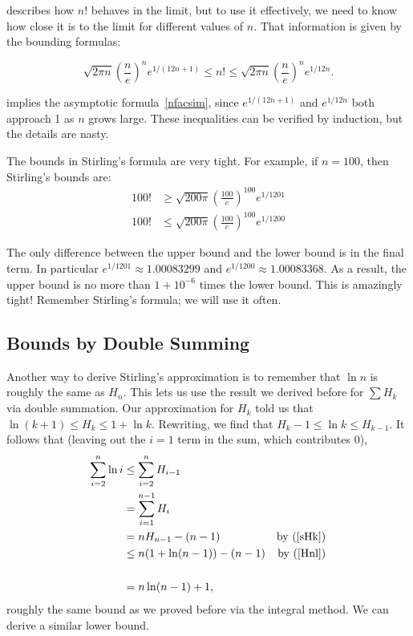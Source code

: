  describes how $n!$ behaves in the limit, but to
use it effectively, we need to know how close it is to the limit for
different values of $n$.  That information is given by the bounding
formulas:
\begin{fact*}
\[
\sqrt{2 \pi n} \left(\frac{n}{e}\right)^n e^{1/(12n+1)} \leq n! \leq
\sqrt{2 \pi n} \left(\frac{n}{e}\right)^n e^{1/12n}.
\]
\end{fact*}
 implies the asymptotic
formula~\eqref{nfacsim}, since $e^{1/(12n+1)}$ and $e^{1/12n}$ both
approach 1 as $n$ grows large.  These inequalities can be verified by
induction, but the details are nasty.

The bounds in Stirling's formula are very tight.  For example, if $n =
100$, then Stirling's bounds are:
\begin{align*}
100! & \geq  \sqrt{200 \pi} \left(\frac{100}{e}\right)^{100} e^{1/1201} \\
100! & \leq  \sqrt{200 \pi} \left(\frac{100}{e}\right)^{100} e^{1/1200}
\end{align*}

The only difference between the upper bound and the lower bound is in
the final term.  In particular $e^{1/1201} \approx 1.00083299$ and
$e^{1/1200} \approx 1.00083368$.  As a result, the upper bound is no
more than $1 + 10^{-6}$ times the lower bound.  This is amazingly
tight!  Remember Stirling's formula; we will use it often.

\begin{editingnotes}

\subsection*{Bounds by Double Summing}

Another way to derive Stirling's approximation is to remember that
$\ln n$ is roughly the same as $H_{n}$.  This lets us use the result
we derived before for $\sum H_k$ via double summation.  Our
approximation for $H_k$ told us that $\ln(k+1)\le H_k \le 1+\ln k$.
Rewriting, we find that $H_{k}-1 \le \ln k \le H_{k - 1}$.  It follows
that (leaving out the $i=1$ term in the sum, which contributes 0),
\begin{align*}
\sum_{i=2}^n \ln i &\le  \sum_{i=2}^n H_{i-1}\\
&= \sum_{i=1}^{n-1} H_i\\
&= nH_{n-1}-(n-1) & \text{by~(\ref{sHk})}\\
&\le n(1+\ln(n-1))-(n-1) & \text{by~(\ref{Hnl})}\\\\
&=n\ln(n-1)+1,
\end{align*}
roughly the same bound as we proved before via the integral method.
We can derive a similar lower bound.

\end{editingnotes}


